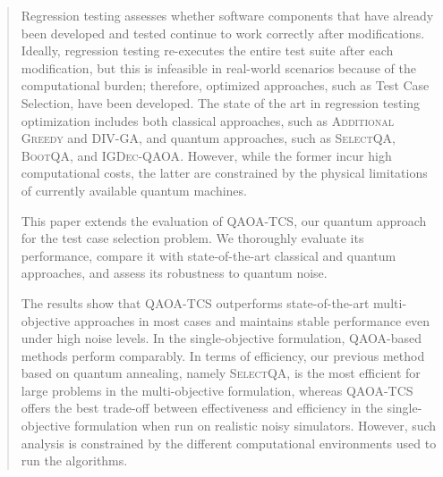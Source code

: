 \begin{abstract}
Regression testing assesses whether software components that have already been developed and tested continue to work correctly after modifications. Ideally, regression testing re-executes the entire test suite after each modification, but this is infeasible in real-world scenarios because of the computational burden; therefore, optimized approaches, such as Test Case Selection, have been developed. The state of the art in regression testing optimization includes both classical approaches, such as \textsc{Additional Greedy} and \textsc{DIV-GA}, and quantum approaches, such as \textsc{SelectQA}, \textsc{BootQA}, and \textsc{IGDec-QAOA}. However, while the former incur high computational costs, the latter are constrained by the physical limitations of currently available quantum machines.

This paper extends the evaluation of \textsc{QAOA-TCS}, our quantum approach for the test case selection problem. We thoroughly evaluate its performance, compare it with state-of-the-art classical and quantum approaches, and assess its robustness to quantum noise.

The results show that \textsc{QAOA-TCS} outperforms state-of-the-art multi-objective approaches in most cases and maintains stable performance even under high noise levels. In the single-objective formulation, QAOA-based methods perform comparably. In terms of efficiency, our previous method based on quantum annealing, namely \textsc{SelectQA}, is the most efficient for large problems in the multi-objective formulation, whereas \textsc{QAOA-TCS} offers the best trade-off between effectiveness and efficiency in the single-objective formulation when run on realistic noisy simulators. However, such analysis is constrained by the different computational environments used to run the algorithms.
\end{abstract}


